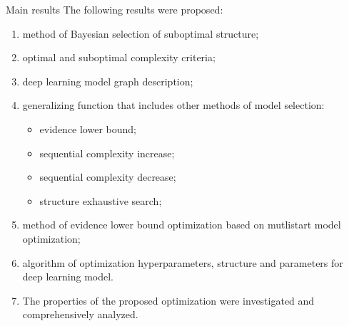 \documentclass[usenames,dvipsnames,11pt,pdf,utf8,russian,aspectratio=43]{beamer}
\begin{document}
\begin{frame}{Main results}
\footnotesize
The following results were proposed:
\begin{enumerate}
\item method of Bayesian selection of suboptimal structure;
\item optimal and suboptimal complexity criteria;
\item deep learning model graph description;
\item generalizing function that includes other methods of model selection:
\begin{itemize}
\footnotesize
\item evidence lower bound;
\item sequential complexity increase;
\item sequential complexity decrease;
\item structure exhaustive search;
\end{itemize}


\item method of evidence lower bound optimization based on mutlistart model optimization;
\item algorithm of optimization hyperparameters, structure and parameters for deep learning model.
\item The properties of the proposed optimization were investigated and comprehensively analyzed.

\end{enumerate}
\end{frame}
\end{document}

